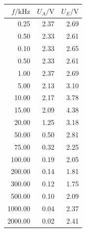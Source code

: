\documentclass[]{scrartcl}
\begin{document}
\begin{table}[H]
	\centering
	\label{tab:ggverst_d}
	\hskip-1.50cm
	\begin{tabular}{r r r}
		\toprule
		$f / \si{\kilo\hertz}$ & $U_A/\si{\volt}$ & $U_E/\si{\volt}$ \\
		\midrule
		0.25	&	2.37	&	2.69 \\
		0.50	&	2.33	&	2.61 \\
		0.10	&	2.33	&	2.65 \\
		0.50	&	2.33	&	2.61 \\
		1.00	&	2.37	&	2.69 \\
		5.00	&	2.13	&	3.10 \\
		10.00	&	2.17	&	3.78 \\
		15.00	&	2.09	&	4.38 \\
		20.00	&	1.25	&	3.18 \\
		50.00	&	0.50	&	2.81 \\
		75.00	&	0.32	&	2.25 \\
		100.00	&	0.19	&	2.05 \\
		200.00	&	0.14	&	1.81 \\
		300.00	&	0.12	&	1.75 \\
		500.00	&	0.10	&	2.09 \\
		1000.00	&	0.04	&	2.37 \\
		2000.00	&	0.02	&	2.41 \\	
		\bottomrule
	\end{tabular}
\end{table}
		
\end{document}
